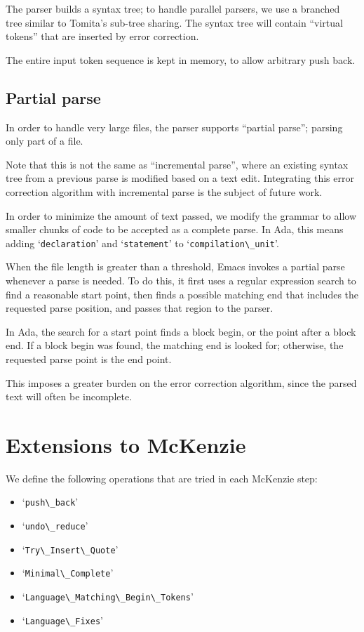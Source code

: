 \documentclass{article}
\newcommand{\code}[1]{`\lstinline|#1|'}
\begin{document}
The parser builds a syntax tree; to handle parallel parsers, we use a
branched tree similar to Tomita's sub-tree sharing. The syntax tree
will contain ``virtual tokens'' that are inserted by error correction.

The entire input token sequence is kept in memory, to allow arbitrary
push back.

\subsection{Partial parse}
In order to handle very large files, the parser supports ``partial
parse''; parsing only part of a file.

Note that this is not the same as ``incremental parse'', where an
existing syntax tree from a previous parse is modified based on a text
edit. Integrating this error correction algorithm with incremental
parse is the subject of future work.

In order to minimize the amount of text passed, we modify the grammar
to allow smaller chunks of code to be accepted as a complete parse. In
Ada, this means adding \code{declaration} and \code{statement} to
\code{compilation\_unit}.

When the file length is greater than a threshold, Emacs invokes a
partial parse whenever a parse is needed. To do this, it first uses a
regular expression search to find a reasonable start point, then finds
a possible matching end that includes the requested parse position, and
passes that region to the parser.

In Ada, the search for a start point finds a block begin, or the point
after a block end. If a block begin was found, the matching end is
looked for; otherwise, the requested parse point is the end point.

This imposes a greater burden on the error correction algorithm, since
the parsed text will often be incomplete.

\section{Extensions to McKenzie}
We define the following operations that are tried in each McKenzie
step:
\begin{itemize}
\item \code{push\_back}
\item \code{undo\_reduce}
\item \code{Try\_Insert\_Quote}
\item \code{Minimal\_Complete}
\item \code{Language\_Matching\_Begin\_Tokens}
\item \code{Language\_Fixes}
\end{itemize}
\end{document}
